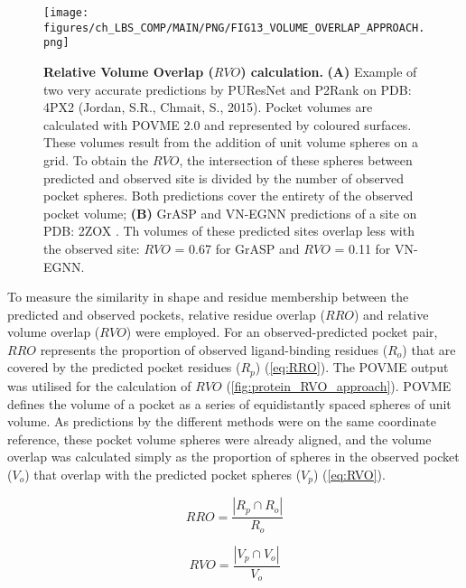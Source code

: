 \begin{figure}[htbp!]
    \centering
    \texttt{[image: figures/ch\_LBS\_COMP/MAIN/PNG/FIG13\_VOLUME\_OVERLAP\_APPROACH.png]}
    \caption[Relative Volume Overlap ($RVO$) calculation]{\textbf{Relative Volume Overlap ($RVO$) calculation.} \textbf{(A)} Example of two very accurate predictions by PUResNet and P2Rank on PDB: 4PX2 (Jordan, S.R., Chmait, S., 2015). Pocket volumes are calculated with POVME 2.0 and represented by coloured surfaces. These volumes result from the addition of unit volume spheres on a grid. To obtain the $RVO$, the intersection of these spheres between predicted and observed site is divided by the number of observed pocket spheres. Both predictions cover the entirety of the observed pocket volume; \textbf{(B)} GrASP and VN-EGNN predictions of a site on PDB: 2ZOX \cite{NOGUCHI_2008_STRUCTURE}. Th volumes of these predicted sites overlap less with the observed site: $RVO$ = 0.67 for GrASP and $RVO$ = 0.11 for VN-EGNN.}
    \label{fig:protein_RVO_approach}
\end{figure}

\FloatBarrier

To measure the similarity in shape and residue membership between the predicted and observed pockets, relative residue overlap ($RRO$) and relative volume overlap ($RVO$) were employed. For an observed-predicted pocket pair, $RRO$ represents the proportion of observed ligand-binding residues ($R_{o}$) that are covered by the predicted pocket residues ($R_{p}$) (\autoref{eq:RRO}). The POVME output was utilised for the calculation of $RVO$ (\autoref{fig:protein_RVO_approach}). POVME defines the volume of a pocket as a series of equidistantly spaced spheres of unit volume. As predictions by the different methods were on the same coordinate reference, these pocket volume spheres were already aligned, and the volume overlap was calculated simply as the proportion of spheres in the observed pocket ($V_{o}$) that overlap with the predicted pocket spheres ($V_{p}$) (\autoref{eq:RVO}).

\begin{equation}
RRO = \frac{|R_p \cap R_o|}{R_o}
\label{eq:RRO}
\end{equation}

\begin{equation}
RVO = \frac{|V_p \cap V_o|}{V_o}
\label{eq:RVO}
\end{equation}


